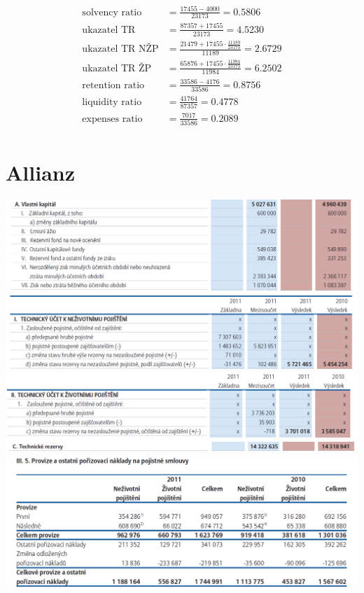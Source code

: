 \documentclass[12pt,oneside]{fithesis}
\begin{document}
\begin{align*}
	\text{solvency ratio}&=\frac{17 455-4 000}{23 173}=0.5806\\
	\text{ukazatel TR}&=\frac{87 357+17 455}{23 173}=4.5230\\
	\text{ukazatel TR NŽP}&=\frac{21479+17 455\cdot\frac{11189}{23173}}{11189}=2.6729\\
	\text{ukazatel TR ŽP}&=\frac{65876+17 455\cdot\frac{11984}{23173}}{11984}=6.2502\\
	\text{retention ratio}&=\frac{33586-4176}{33 586}=0.8756\\
	\text{liquidity ratio}&=\frac{41 764}{87 357}=0.4778\\
	\text{expenses ratio}&=\frac{7 017}{33 586}=0.2089\\
\end{align*}
\section{Allianz}
\includegraphics[width=1.0\textwidth]{al-vlk.png}
\includegraphics[width=1.0\textwidth]{al-poj1.png}
\includegraphics[width=1.0\textwidth]{al-poj2.png}
\includegraphics[width=1.0\textwidth]{al-tr.png}
\includegraphics[width=1.0\textwidth]{al-nakl1.png}
\end{document}
